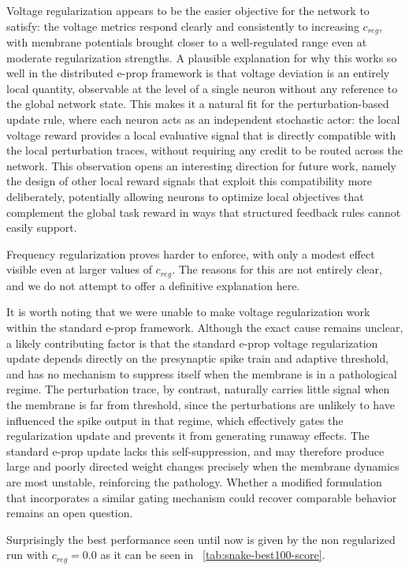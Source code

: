 Voltage regularization appears to be the easier objective for the network
to satisfy: the voltage metrics respond clearly and consistently to
increasing $c_{reg}$, with membrane potentials brought closer to a
well-regulated range even at moderate regularization strengths. A plausible
explanation for why this works so well in the distributed e-prop framework
is that voltage deviation is an entirely local quantity, observable at the
level of a single neuron without any reference to the global network state.
This makes it a natural fit for the perturbation-based update rule, where
each neuron acts as an independent stochastic actor: the local voltage
reward provides a local evaluative signal that is directly compatible with
the local perturbation traces, without requiring any credit to be routed
across the network. This observation opens an interesting direction for
future work, namely the design of other local reward signals that exploit
this compatibility more deliberately, potentially allowing neurons to
optimize local objectives that complement the global task reward in ways
that structured feedback rules cannot easily support.

Frequency regularization proves harder to enforce, with only a modest effect
visible even at larger values of $c_{reg}$. The reasons for this are not
entirely clear, and we do not attempt to offer a definitive explanation here.

It is worth noting that we were unable to make voltage regularization work
within the standard e-prop framework. Although the exact cause remains
unclear, a likely contributing factor is that the standard e-prop voltage
regularization update depends directly on the presynaptic spike train and
adaptive threshold, and has no mechanism to suppress itself when the membrane
is in a pathological regime. The perturbation trace, by contrast, naturally
carries little signal when the membrane is far from threshold, since the
perturbations are unlikely to have influenced the spike output in that
regime, which effectively gates the regularization update and prevents it
from generating runaway effects. The standard e-prop update lacks this
self-suppression, and may therefore produce large and poorly directed weight
changes precisely when the membrane dynamics are most unstable, reinforcing
the pathology. Whether a modified formulation that
incorporates a similar gating mechanism could recover comparable behavior
remains an open question.

Surprisingly the best performance seen until now is given by the non 
regularized run with $c_{reg}=0.0$ as it can be seen in ~\ref{tab:snake-best100-score}.

